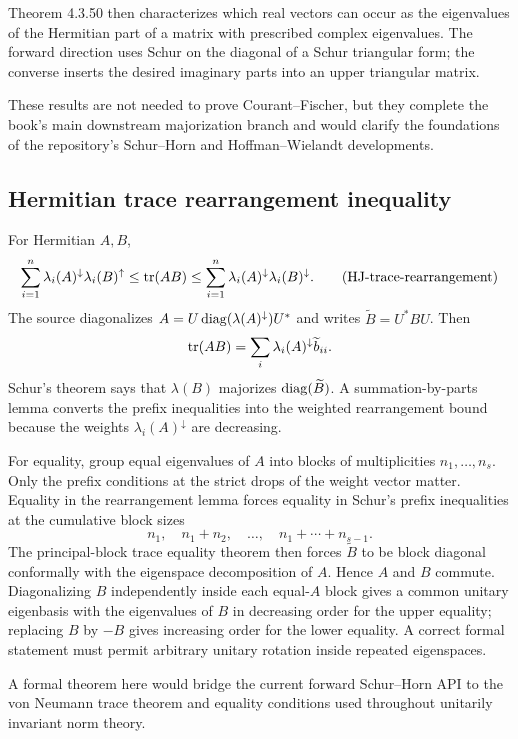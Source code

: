 Theorem 4.3.50 then characterizes which real vectors can occur as the eigenvalues of the Hermitian part of a matrix with prescribed complex eigenvalues. The forward direction uses Schur on the diagonal of a Schur triangular form; the converse inserts the desired imaginary parts into an upper triangular matrix.

These results are not needed to prove Courant--Fischer, but they complete the book's main downstream majorization branch and would clarify the foundations of the repository's Schur--Horn and Hoffman--Wielandt developments.

\subsection{Hermitian trace rearrangement inequality}

For Hermitian $A,B$,
\begin{equation}
  \sum_{i=1}^n\lambda_i(A)^{\downarrow}\lambda_i(B)^{\uparrow}
  \le\operatorname{tr}(AB)
  \le\sum_{i=1}^n\lambda_i(A)^{\downarrow}\lambda_i(B)^{\downarrow}. \tag{HJ-trace-rearrangement}
\end{equation}
The source diagonalizes $A=U\operatorname{diag}(\lambda(A)^{\downarrow})U^*$ and writes $\widetilde B=U^*BU$. Then
\[
  \operatorname{tr}(AB)=\sum_i\lambda_i(A)^{\downarrow}\widetilde b_{ii}.
\]
Schur's theorem says that $\lambda(B)$ majorizes $\operatorname{diag}(\widetilde B)$. A summation-by-parts lemma converts the prefix inequalities into the weighted rearrangement bound because the weights $\lambda_i(A)^{\downarrow}$ are decreasing.

For equality, group equal eigenvalues of $A$ into blocks of multiplicities $n_1,\dots,n_s$. Only the prefix conditions at the strict drops of the weight vector matter. Equality in the rearrangement lemma forces equality in Schur's prefix inequalities at the cumulative block sizes
\[
  n_1,\quad n_1+n_2,\quad\dots,\quad n_1+\cdots+n_{s-1}.
\]
The principal-block trace equality theorem then forces $\widetilde B$ to be block diagonal conformally with the eigenspace decomposition of $A$. Hence $A$ and $B$ commute. Diagonalizing $B$ independently inside each equal-$A$ block gives a common unitary eigenbasis with the eigenvalues of $B$ in decreasing order for the upper equality; replacing $B$ by $-B$ gives increasing order for the lower equality. A correct formal statement must permit arbitrary unitary rotation inside repeated eigenspaces.

A formal theorem here would bridge the current forward Schur--Horn API to the von Neumann trace theorem and equality conditions used throughout unitarily invariant norm theory.

